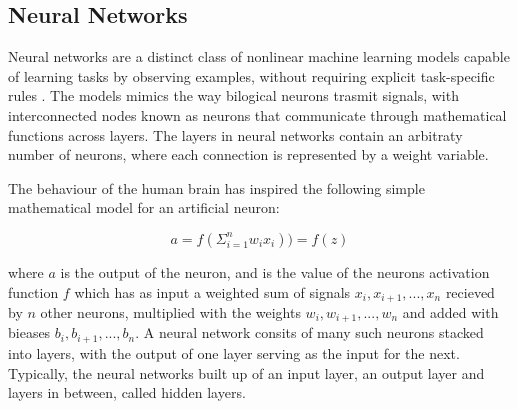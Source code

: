 \documentclass[a4paper, UKenglish, 11pt]{uiomaster}
\begin{document}
%
%
%
%




\subsection{Neural Networks}
Neural networks are a distinct class of nonlinear machine learning models capable of learning tasks by observing examples, without requiring explicit task-specific rules \cite{Hjorth-Jensen2022}. The models mimics the way bilogical neurons trasmit signals, with interconnected nodes known as neurons that communicate through mathematical functions across layers. The layers in neural networks contain an arbitraty number of neurons, where each connection is represented by a weight variable.

The behaviour of the human brain has inspired the following simple mathematical model for an artificial neuron:

\begin{equation}
  a = f \left( \Sigma_{i=1}^n w_ix_i \right) ) = f(z)
\label{eq:neuron}
\end{equation}

where $a$ is the output of the neuron, and is the value of the neurons activation function $f$ which has as input a weighted sum of signals $x_i, x_{i+1},...,x_n$ recieved by $n$ other neurons, multiplied with the weights $w_i, w_{i+1}, ..., w_{n}$ and added with bieases $b_i, b_{i+1}, ..., b_{n}$.  A neural network consits of many such neurons stacked into layers, with the output of one layer serving as the input for the next. Typically, the neural networks built up of an input layer, an output layer and layers in between, called hidden layers.
\end{document}
